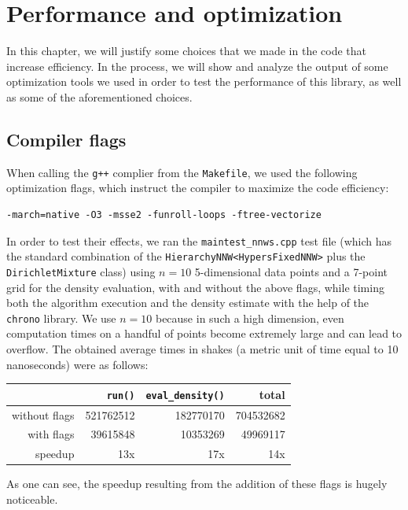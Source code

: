 \chapter{Performance and optimization}
In this chapter, we will justify some choices that we made in the code that increase efficiency.
In the process, we will show and analyze the output of some optimization tools we used in order to test the performance of this library, as well as some of the aforementioned choices.

\section{Compiler flags} \label{opt-flags}
When calling the \verb|g++| complier from the \verb|Makefile|, we used the following optimization flags, which instruct the compiler to maximize the code efficiency:
\begin{verbatim}
-march=native -O3 -msse2 -funroll-loops -ftree-vectorize
\end{verbatim}
In order to test their effects, we ran the \verb|maintest_nnws.cpp| test file (which has the standard combination of the \verb|HierarchyNNW<HypersFixedNNW>| plus the \verb|DirichletMixture| class) using $n=10$ 5-dimensional data points and a 7-point grid for the density evaluation, with and without the above flags, while timing both the algorithm execution and the density estimate with the help of the \verb|chrono| library.
We use $n=10$ because in such a high dimension, even computation times on a handful of points become extremely large and can lead to overflow.
The obtained average times in shakes (a metric unit of time equal to 10 nanoseconds) were as follows:
\begin{center}
	\begin{tabular}{r|r|r|r}
	              	& \verb|run()| & \verb|eval_density()| & total \\ \hline
		without flags & 521762512 & 182770170 & 704532682 \\
		with flags    &  39615848 &  10353269 &  49969117 \\
		speedup       &       13x &       17x &       14x
	\end{tabular}
\end{center}
As one can see, the speedup resulting from the addition of these flags is hugely noticeable.


